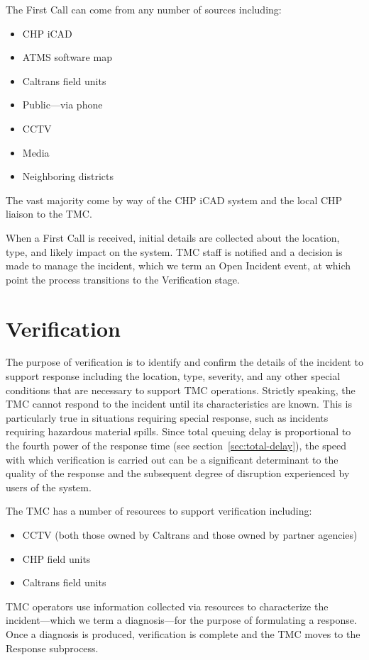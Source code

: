 \documentclass[12pt]{report}
\newcounter{time}
\begin{document}
The {\sc First Call} can come from any number of sources including:
\begin{itemize}
\item \ac{CHP} \ac{iCAD}
\item \acl{ATMS} software map
\item Caltrans field units
\item Public---via phone
\item CCTV
\item Media
\item Neighboring districts
\end{itemize}
The vast majority come by way of the \ac{CHP} \ac{iCAD} system and the local
\ac{CHP} liaison to the \ac{TMC}.

When a {\sc First Call} is received, initial details are collected about the
location, type, and likely impact on the system.  \ac{TMC} staff is notified and
a decision is made to manage the incident, which we term an {\sc Open Incident}
event, at which point the process transitions to the Verification stage.


\section{Verification}
\label{sec:verification}

The purpose of verification is to identify and confirm the details of the
incident to support response including the location, type, severity, and any
other special conditions that are necessary to support \ac{TMC} operations.
Strictly speaking, the \ac{TMC} cannot respond to the incident until its
characteristics are known.  This is particularly true in situations requiring
special response, such as incidents requiring hazardous material spills.  Since
total queuing delay is proportional to the fourth power of the response time
(see section~\ref{sec:total-delay}), the speed with which verification is
carried out can be a significant determinant to the quality of the response and
the subsequent degree of disruption experienced by users of the system.

The \ac{TMC} has a number of resources to support verification including:
\begin{itemize}
\item CCTV (both those owned by Caltrans and those owned by partner
  agencies)
\item \ac{CHP} field units
\item Caltrans field units
\end{itemize}
\ac{TMC} operators use information collected via resources to characterize the
incident---which we term a diagnosis---for the purpose of formulating a
response.  Once a diagnosis is produced, verification is complete and the
\ac{TMC} moves to the {\sc Response} subprocess.
\end{document}

